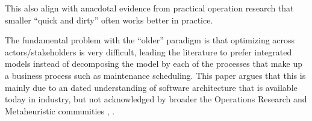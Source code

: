 This also align with anacdotal evidence from practical operation research 
that smaller ``quick and dirty'' often works better in practice. 

The fundamental problem with the ``older'' paradigm is that optimizing across
actors/stakeholders is very difficult, leading the literature to prefer
integrated models instead of decomposing the model by each of the
processes that make up a business process such as maintenance scheduling.
This paper argues that this is mainly due to an dated understanding of
software architecture that is available today in industry, but not
acknowledged by broader the Operations Research and Metaheuristic
communities \citep{talbiMetaheuristicsDesignImplementation2009},
\citep{gendreauHandbookMetaheuristics2019}.
